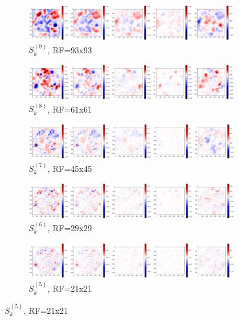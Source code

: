 \documentclass[preprint]{elsarticle}
\theoremstyle{definition} %
\theoremstyle{remark}
\begin{document}
\begin{figure}[h!]
	\centering
	\begin{subfigure}[b]{\textwidth}
		\includegraphics[width=\textwidth]{figures/score_prop_23713_left/score_k93.png}
		\caption{$S_k^{(9)}$, RF=93x93}
		\label{fig:score_k93}
	\end{subfigure}	
	\begin{subfigure}[b]{\textwidth}
		\includegraphics[width=\textwidth]{figures/score_prop_23713_left/score_k61.png}
		\caption{$S_k^{(8)}$, RF=61x61}
		\label{fig:score_k61}
	\end{subfigure}
	
	\begin{subfigure}[b]{\textwidth}
		\includegraphics[width=\textwidth]{figures/score_prop_23713_left/score_k45.png}
		\caption{$S_k^{(7)}$, RF=45x45}
		\label{fig:score_k45}
	\end{subfigure}
	
	\begin{subfigure}[b]{\textwidth}
		\includegraphics[width=\textwidth]{figures/score_prop_23713_left/score_k29.png}
		\caption{$S_k^{(6)}$, RF=29x29}
		\label{fig:score_k29}
	\end{subfigure}
	
	\begin{subfigure}[b]{\textwidth}
		\includegraphics[width=\textwidth]{figures/score_prop_23713_left/score_k21.png}
		\caption{$S_k^{(5)}$, RF=21x21}
		\label{fig:score_k21}
	\end{subfigure}
	

\end{figure}
\end{document}
